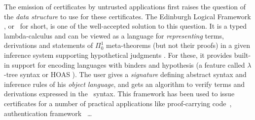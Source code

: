 \documentclass{llncs}
\begin{document}
The emission of certificates by untrusted applications first raises
the question of the \emph{data structure} to use for these
certificates. %
The Edinburgh Logical Framework \cite{harper1993framework}, or \LF\
for short, is one of the well-accepted solution to this question. It
is a typed lambda-calculus and can be viewed as a language for
\emph{representing} terms, derivations and statements of $\Pi_0^1$
meta-theorems (but not their proofs) in a given inference system
supporting hypothetical judgments \cite{pfenning2001logical}. For
these, it provides built-in support for encoding languages with
binders and hypothesis (a feature called $\lambda$-tree syntax or HOAS
\cite{pfenning1988higher}). The user gives a \emph{signature} defining
abstract syntax and inference rules of his \emph{object language}, and
gets an algorithm to verify terms and derivations expressed in the
\LF\ syntax.
This framework has been used to issue certificates for a number of
practical applications like proof-carrying
code~\cite{necula1997proof}, authentication
framework~\cite{appel1999proof} \ldots %
\end{document}
